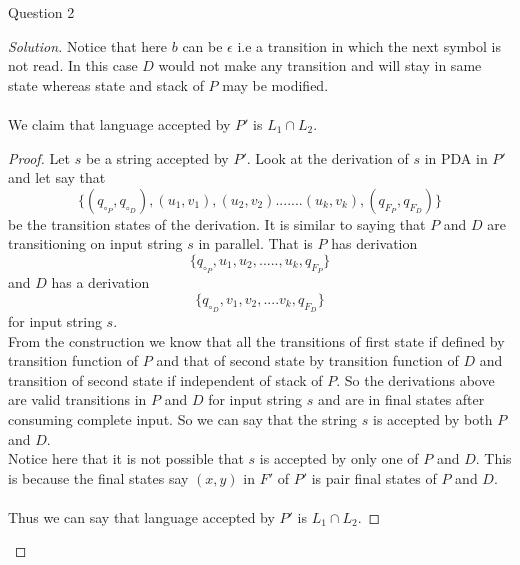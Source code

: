 \begin{solution}{Question 2}
\begin{proof}[Solution]
    Notice that here $b$ can be $\epsilon$ i.e a transition in which the next symbol is not read. In this case $D$ would not make any transition and will stay in same state whereas state and stack of $P$ may be modified.\\
    \\
    We claim that language accepted by $P'$ is $L_1 \cap L_2$. 
    \begin{proof}
    Let $s$ be a string accepted by $P'$. Look at the derivation of $s$ in PDA in $P'$ and let say that 
    \[\{(q_{\circ_P},  q_{\circ_D}), (u_1, v_1), (u_2, v_2).......(u_k, v_k), (q_{F_P}, q_{F_D})\}\] 
    be the transition states of the derivation. It is similar to saying that $P$ and $D$ are transitioning on input string $s$ in parallel. That is $P$ has derivation \[\{q_{\circ_P}, u_1, u_2, ....., u_k, q_{F_P}\}\] 
    and $D$ has a derivation  
    \[\{q_{\circ_D}, v_1, v_2, .... v_k, q_{F_D}\}\] 
    for input string $s$. \\
    From the construction we know that all the transitions of first state if defined by transition function of $P$ and that of second state by transition function of $D$ and transition of second state if independent of stack of $P$. So the derivations above are valid transitions in $P$ and $D$ for input string $s$ and are in final states after consuming complete input. So we can say that the string $s$ is accepted by both $P$ and $D$. \\
    Notice here that it is not possible that $s$ is accepted by only one of $P$ and $D$. This is because the final states say $(x, y)$ in $F'$ of $P'$ is pair final states of $P$ and $D$.\\
    \\
    Thus we can say that language accepted by $P'$ is $L_1 \cap L_2$.
    \end{proof}
        
    \end{proof}
\end{solution}
